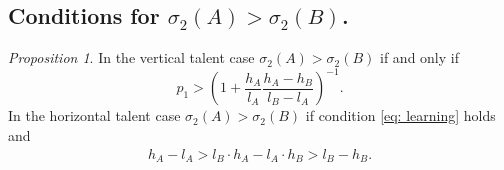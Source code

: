 \documentclass[12pt,american]{paper}
\theoremstyle{remark}
\newtheorem{prop}{Proposition}
\begin{document}

\subsection*{Conditions for $\sigma_2(A)>\sigma_2(B)$.}\label{sec:appendix-learning}

\begin{prop}\label{prop:nsc_learning}
In the vertical talent case $\sigma_2(A)>\sigma_2(B)$ if and only if 
\begin{equation}\label{eq: learning}
p_1>\left(1+\frac{h_A}{l_A}\frac{h_A-h_B}{l_B-l_A} \right)^{-1}.
\end{equation}
In the horizontal talent case  $\sigma_2(A)>\sigma_2(B)$ if condition \eqref{eq: learning} holds and
\begin{align*}
h_A-l_A>l_B \cdot h_A-l_A \cdot h_B >l_B-h_B.
\end{align*}
\end{prop}
\end{document}
